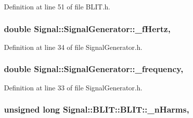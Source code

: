 Definition at line 51 of file B\+L\+I\+T.\+h.

\hypertarget{classSignal_1_1SignalGenerator_a85a4702347352bab1c71e0a8df8437d6}{
\subsubsection[{\+\_\+f\+Hertz}]{\setlength{\rightskip}{0pt plus 5cm}double Signal\+::\+Signal\+Generator\+::\+\_\+f\+Hertz\hspace{0.3cm}{\ttfamily [protected]}, {\ttfamily [inherited]}}}\label{classSignal_1_1SignalGenerator_a85a4702347352bab1c71e0a8df8437d6}


Definition at line 34 of file Signal\+Generator.\+h.

\hypertarget{classSignal_1_1SignalGenerator_a7f107461333bce68c5dad412db96a8c2}{
\subsubsection[{\+\_\+frequency}]{\setlength{\rightskip}{0pt plus 5cm}double Signal\+::\+Signal\+Generator\+::\+\_\+frequency\hspace{0.3cm}{\ttfamily [protected]}, {\ttfamily [inherited]}}}\label{classSignal_1_1SignalGenerator_a7f107461333bce68c5dad412db96a8c2}


Definition at line 33 of file Signal\+Generator.\+h.

\hypertarget{classSignal_1_1BLIT_1_1BLIT_a0bfbf4e7515a42fab7df748b8497f648}{
\subsubsection[{\+\_\+n\+Harms}]{\setlength{\rightskip}{0pt plus 5cm}unsigned long Signal\+::\+B\+L\+I\+T\+::\+B\+L\+I\+T\+::\+\_\+n\+Harms\hspace{0.3cm}{\ttfamily [protected]}, {\ttfamily [inherited]}}}\label{classSignal_1_1BLIT_1_1BLIT_a0bfbf4e7515a42fab7df748b8497f648}


